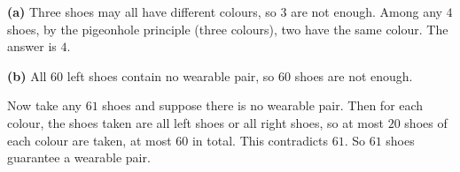 \textbf{(a)} Three shoes may all have different colours, so $3$ are not enough. Among any $4$ shoes, by the pigeonhole principle (three colours), two have the same colour. The answer is $\boxed{4}$.

\textbf{(b)} All $60$ left shoes contain no wearable pair, so $60$ shoes are not enough.

Now take any $61$ shoes and suppose there is no wearable pair. Then for each colour, the shoes taken are all left shoes or all right shoes, so at most $20$ shoes of each colour are taken, at most $60$ in total. This contradicts $61$. So $\boxed{61}$ shoes guarantee a wearable pair.
